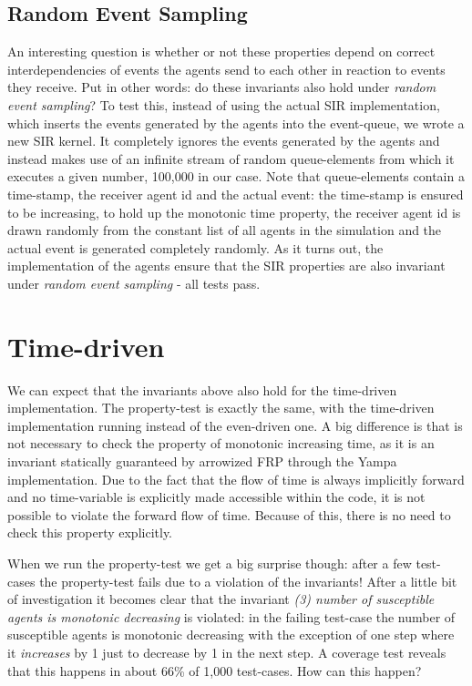 \subsection{Random Event Sampling}
An interesting question is whether or not these properties depend on correct interdependencies of events the agents send to each other in reaction to events they receive. Put in other words: do these invariants also hold under \textit{random event sampling}? To test this, instead of using the actual SIR implementation, which inserts the events generated by the agents into the event-queue, we wrote a new SIR kernel. It completely ignores the events generated by the agents and instead makes use of an infinite stream of random queue-elements from which it executes a given number, 100,000 in our case. Note that queue-elements contain a time-stamp, the receiver agent id and the actual event: the time-stamp is ensured to be increasing, to hold up the monotonic time property, the receiver agent id is drawn randomly from the constant list of all agents in the simulation and the actual event is generated completely randomly. As it turns out, the implementation of the agents ensure that the SIR properties are also invariant under \textit{random event sampling} - all tests pass.

\section{Time-driven}
We can expect that the invariants above also hold for the time-driven implementation. The property-test is exactly the same, with the time-driven implementation running instead of the even-driven one. A big difference is that is not necessary to check the property of monotonic increasing time, as it is an invariant statically guaranteed by arrowized FRP through the Yampa implementation. Due to the fact that the flow of time is always implicitly forward and no time-variable is explicitly made accessible within the code, it is not possible to violate the forward flow of time. Because of this, there is no need to check this property explicitly.

When we run the property-test we get a big surprise though: after a few test-cases the property-test fails due to a violation of the invariants! After a little bit of investigation it becomes clear that the invariant \textit{(3) number of susceptible agents is monotonic decreasing} is violated: in the failing test-case the number of susceptible agents is monotonic decreasing with the exception of one step where it \textit{increases} by 1 just to decrease by 1 in the next step. A coverage test reveals that this happens in about 66\% of 1,000 test-cases. How can this happen?

